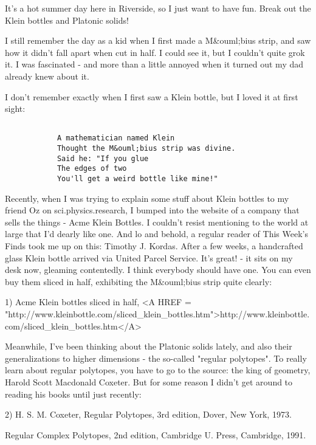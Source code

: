 


It's a hot summer day here in Riverside, so I just want to have fun. 
Break out the Klein bottles and Platonic solids!  

I still remember the day as a kid when I first made a M&ouml;bius strip, and
saw how it didn't fall apart when cut in half.  I could see it, but I
couldn't quite grok it.  I was fascinated - and more than a little
annoyed when it turned out my dad already knew about it.  

I don't remember exactly when I first saw a Klein bottle, but I loved it
at first sight:


\begin{verbatim}

            A mathematician named Klein
            Thought the M&ouml;bius strip was divine.
            Said he: "If you glue 
            The edges of two
            You'll get a weird bottle like mine!"
\end{verbatim}
    
Recently, when I was trying to explain some stuff about Klein bottles to
my friend Oz on sci.physics.research, I bumped into the website of a
company that sells the things - Acme Klein Bottles.  I couldn't resist
mentioning to the world at large that I'd dearly like one.  And lo and
behold, a regular reader of This Week's Finds took me up on this:
Timothy J. Kordas.  After a few weeks, a handcrafted glass Klein bottle
arrived via United Parcel Service.  It's great! - it sits on my desk
now, gleaming contentedly.  I think everybody should have one.  You can
even buy them sliced in half, exhibiting the M&ouml;bius strip quite clearly:

1) Acme Klein bottles sliced in half, 
<A HREF = "http://www.kleinbottle.com/sliced_klein_bottles.htm">http://www.kleinbottle.com/sliced_klein_bottles.htm</A>

Meanwhile, I've been thinking about the Platonic solids lately, and also
their generalizations to higher dimensions - the so-called "regular
polytopes".  To really learn about regular polytopes, you have to go to
the source: the king of geometry, Harold Scott Macdonald Coxeter.
But for some reason I didn't get around to reading his
books until just recently:

2) H. S. M. Coxeter, Regular Polytopes, 3rd edition, Dover, New York, 1973.

Regular Complex Polytopes, 2nd edition, Cambridge U. Press, Cambridge, 1991.

